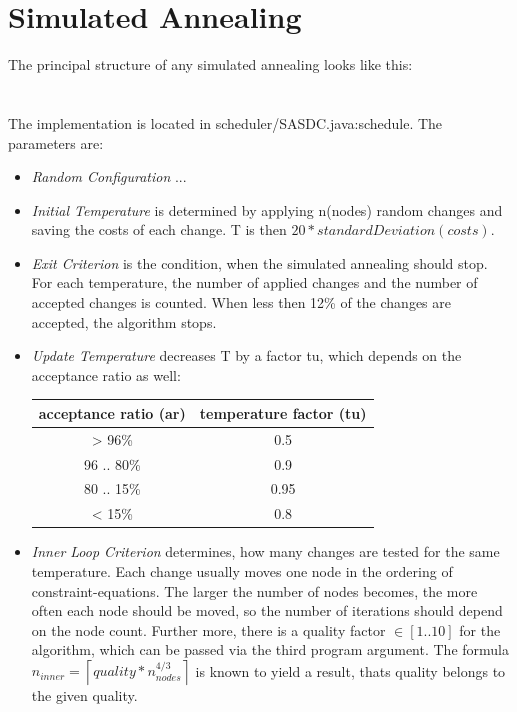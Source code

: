\documentclass[colorback,accentcolor=tud1c,11pt]{tudreport}
\begin{document}
  \chapter{Simulated Annealing}
  The principal structure of any simulated annealing looks like this:\\
  \\ \\
  The implementation is located in scheduler/SASDC.java:schedule. The parameters are:
  \begin{itemize}
  	\item \emph{Random Configuration} ...
  	\item \emph{Initial Temperature} is determined by applying n(nodes) random changes and saving the costs of each change. T is then $20 * standardDeviation(costs)$.
  	\item \emph{Exit Criterion} is the condition, when the simulated annealing should stop. For each temperature, the number of applied changes and the number of accepted changes is counted. When less then 12\% of the changes are accepted, the algorithm stops.
  	\item \emph{Update Temperature} decreases T by a factor tu, which depends on the acceptance ratio as well:
  	\begin{tabular}{ c | c }
  		acceptance ratio (ar) & temperature factor (tu) \\
  		\hline
  		> 96\% & 0.5 \\
  		96 .. 80\% & 0.9 \\
  		80 .. 15\% & 0.95 \\
  		< 15\% & 0.8 \\
  	\end{tabular}
    \item \emph{Inner Loop Criterion} determines, how many changes are tested for the same temperature. Each change usually moves one node in the ordering of constraint-equations. The larger the number of nodes becomes, the more often each node should be moved, so the number of iterations should depend on the node count. Further more, there is a quality factor $\in [1 .. 10]$ for the algorithm, which can be passed via the third program argument. The formula $n_{inner} = \left\lceil quality * n_{nodes}^{4/3} \right\rceil$ is known to yield a result, thats quality belongs to the given quality.
  \end{itemize}
\end{document}
